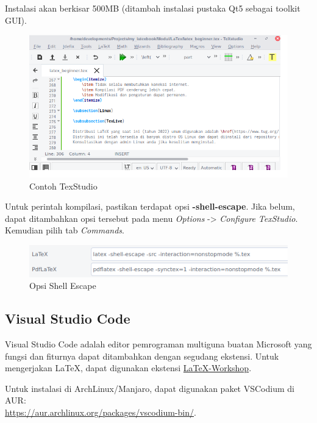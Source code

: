 \documentclass{book} %
\begin{document}
	Instalasi akan berkisar 500MB (ditambah instalasi pustaka Qt5 sebagai toolkit GUI).

	\newpage
	\begin{figure}[!ht]
		\centering
		\includegraphics[width=400pt]{images/texstudio}
		\caption{Contoh TexStudio}
	\end{figure}

	Untuk perintah kompilasi, pastikan terdapat opsi \textbf{-shell-escape}.
	Jika belum, dapat ditambahkan opsi tersebut pada menu \textit{Options} -> \textit{Configure TexStudio}.
	Kemudian pilih tab \textit{Commands}.

	\begin{figure}[!ht]
		\centering
		\includegraphics[width=400pt]{images/texstudio_shellescape}
		\caption{Opsi Shell Escape}
	\end{figure}

	\subsection{Visual Studio Code}

	Visual Studio Code adalah editor pemrograman multiguna buatan Microsoft yang fungsi dan fiturnya dapat ditambahkan dengan segudang ekstensi.
	Untuk mengerjakan \LaTeX{}, dapat digunakan ekstensi \href{https://github.com/James-Yu/LaTeX-Workshop}{LaTeX-Workshop}.

	Untuk instalasi di ArchLinux/Manjaro, dapat digunakan paket VSCodium di AUR:\\
	\url{https://aur.archlinux.org/packages/vscodium-bin/}.
\end{document}
